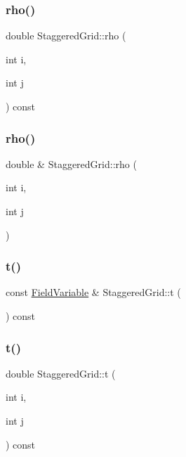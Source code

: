 \subsubsection{\texorpdfstring{rho()}{rho()}\hspace{0.1cm}{\footnotesize\ttfamily [1/2]}}
{\footnotesize\ttfamily double Staggered\+Grid\+::rho (\begin{DoxyParamCaption}\item[{int}]{i,  }\item[{int}]{j }\end{DoxyParamCaption}) const}

\mbox{\label{classStaggeredGrid_a73fd2714e8ce9af369c2dc3b3301369c}} 
\subsubsection{\texorpdfstring{rho()}{rho()}\hspace{0.1cm}{\footnotesize\ttfamily [2/2]}}
{\footnotesize\ttfamily double \& Staggered\+Grid\+::rho (\begin{DoxyParamCaption}\item[{int}]{i,  }\item[{int}]{j }\end{DoxyParamCaption})}

\mbox{\label{classStaggeredGrid_a04ff9b2c14158e1f75860c8e4ef0a101}} 
\subsubsection{\texorpdfstring{t()}{t()}\hspace{0.1cm}{\footnotesize\ttfamily [1/3]}}
{\footnotesize\ttfamily const \mbox{\hyperlink{classFieldVariable}{Field\+Variable}} \& Staggered\+Grid\+::t (\begin{DoxyParamCaption}{ }\end{DoxyParamCaption}) const}

\mbox{\label{classStaggeredGrid_a477e8942e756cc2baecd1aaa5795bb3d}} 
\subsubsection{\texorpdfstring{t()}{t()}\hspace{0.1cm}{\footnotesize\ttfamily [2/3]}}
{\footnotesize\ttfamily double Staggered\+Grid\+::t (\begin{DoxyParamCaption}\item[{int}]{i,  }\item[{int}]{j }\end{DoxyParamCaption}) const}

